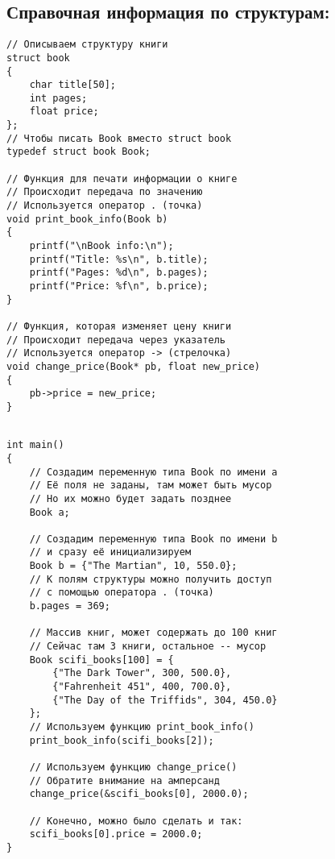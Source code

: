 \documentclass{article}
\begin{document}
\subsection*{Справочная информация по структурам:}
\begin{multicols}{2}
\begin{verbatim}
// Описываем структуру книги
struct book
{
    char title[50];
    int pages;
    float price;
};
// Чтобы писать Book вместо struct book
typedef struct book Book;

// Функция для печати информации о книге
// Происходит передача по значению
// Используется оператор . (точка)
void print_book_info(Book b)
{
    printf("\nBook info:\n");
    printf("Title: %s\n", b.title);
    printf("Pages: %d\n", b.pages);
    printf("Price: %f\n", b.price);
}

// Функция, которая изменяет цену книги
// Происходит передача через указатель
// Используется оператор -> (стрелочка)
void change_price(Book* pb, float new_price)
{
    pb->price = new_price;
}


\end{verbatim}
\begin{verbatim}
int main()
{
    // Создадим переменную типа Book по имени a
    // Её поля не заданы, там может быть мусор
    // Но их можно будет задать позднее
    Book a; 

    // Создадим переменную типа Book по имени b
    // и сразу её инициализируем
    Book b = {"The Martian", 10, 550.0};
    // К полям структуры можно получить доступ
    // с помощью оператора . (точка)
    b.pages = 369;

    // Массив книг, может содержать до 100 книг
    // Сейчас там 3 книги, остальное -- мусор
    Book scifi_books[100] = {
        {"The Dark Tower", 300, 500.0},
        {"Fahrenheit 451", 400, 700.0},
        {"The Day of the Triffids", 304, 450.0}
    };
    // Используем функцию print_book_info()
    print_book_info(scifi_books[2]);
        
    // Используем функцию change_price()
    // Обратите внимание на амперсанд
    change_price(&scifi_books[0], 2000.0);
    
    // Конечно, можно было сделать и так:
    scifi_books[0].price = 2000.0;
}
\end{verbatim}
\end{multicols}
\end{document}
